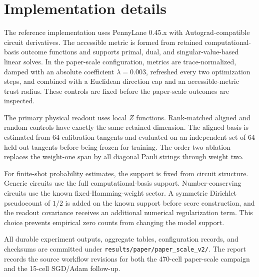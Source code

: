 \section{Implementation details}

The reference implementation uses PennyLane 0.45.x with Autograd-compatible circuit derivatives. The accessible metric is formed from retained computational-basis outcome functions and supports primal, dual, and singular-value-based linear solves. In the paper-scale configuration, metrics are trace-normalized, damped with an absolute coefficient $\lambda=0.003$, refreshed every two optimization steps, and combined with a Euclidean direction cap and an accessible-metric trust radius. These controls are fixed before the paper-scale outcomes are inspected.

The primary physical readout uses local $Z$ functions. Rank-matched aligned and random controls have exactly the same retained dimension. The aligned basis is estimated from 64 calibration tangents and evaluated on an independent set of 64 held-out tangents before being frozen for training. The order-two ablation replaces the weight-one span by all diagonal Pauli strings through weight two.

For finite-shot probability estimates, the support is fixed from circuit structure. Generic circuits use the full computational-basis support. Number-conserving circuits use the known fixed-Hamming-weight sector. A symmetric Dirichlet pseudocount of $1/2$ is added on the known support before score construction, and the readout covariance receives an additional numerical regularization term. This choice prevents empirical zero counts from changing the model support.

All durable experiment outputs, aggregate tables, configuration records, and checksums are committed under \texttt{results/paper/paper\_scale\_v2/}. The report records the source workflow revisions for both the 470-cell paper-scale campaign and the 15-cell SGD/Adam follow-up.
